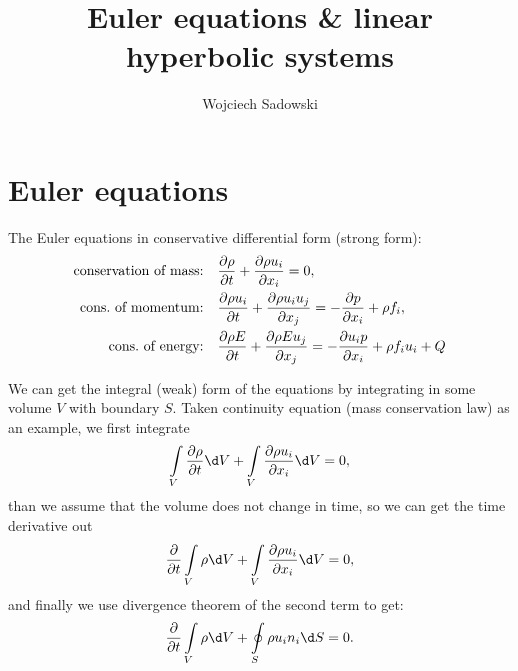 \documentclass[justified, nobib]{tufte-handout}
\title{Euler equations \& linear hyperbolic systems}
\author[Wojciech Sadowski]{Wojciech Sadowski}
\begin{document}
\maketitle%

\tableofcontents

\section{Euler equations}
The Euler equations in conservative differential form
(strong form):
\begin{equation}
	\begin{split}
		\text{conservation of mass:}\quad & \pdv{\rho}{t} + \pdv{\rho u_i}{x_i} = 0,    \\
		\text{cons.\ of momentum:}\quad   & \pdv{\rho u_i}{t} + \pdv{\rho u_i u_j}{x_j}
		= -\pdv{p}{x_i} + \rho f_i,                                                     \\
		\text{cons.\ of energy:}\quad     & \pdv{\rho E}{t} + \pdv{\rho E u_j}{x_j}
		=  -\pdv{u_i p}{x_i} + \rho f_i u_i + Q
	\end{split}
	\label{eq:euler}
\end{equation}

We can get the integral (weak) form of the equations by integrating in some
volume \(V\) with boundary \(S\). Taken continuity equation (mass conservation law)
as an example, we first integrate
\[
	\int\limits_V \pdv{\rho}{t} \d V
	+ \int\limits_V \pdv{\rho u_i}{x_i} \d V = 0,
\]
than we assume that the volume does not change in time, so we can get the time
derivative out
\[
	\pdv{}{t}\int\limits_V \rho \d V
	+ \int\limits_V \pdv{\rho u_i}{x_i} \d V = 0,
\]
and finally we use divergence theorem of the second term to get:
\[
	\pdv{}{t}\int\limits_V \rho \d V
	+ \oint\limits_S\rho u_i n_i \d S = 0.
\]
\end{document}
